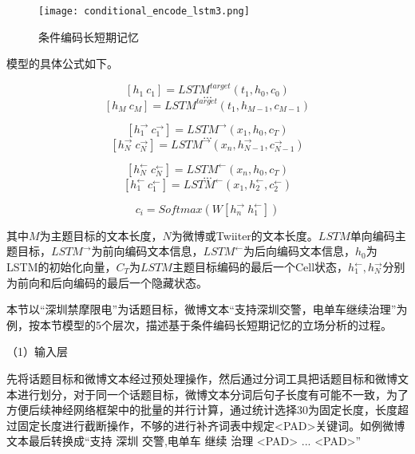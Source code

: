 \begin{figure}[htbp]
	\centering
	\texttt{[image: conditional\_encode\_lstm3.png]}
	\caption[rnn_vanish]{条件编码长短期记忆}
\end{figure}

模型的具体公式如下。

\begin{equation}\label{lstm_f}[h_1~c_1] = LSTM^{target}(t_1,h_0,c_0)\end{equation}
$$...$$
\begin{equation}\label{lstm_f}[h_M~c_M] = LSTM^{target}(t_1,h_{M-1},c_{M-1})\end{equation}

\begin{equation}\label{lstm_f}[h^{→}_{1}~c^{→}_{1}] = LSTM^{→}(x_1,h_0,c_T)\end{equation}
$$...$$
\begin{equation}\label{lstm_f}[h^{→}_{N}~c^{→}_{N}] = LSTM^{→}(x_n,h^{→}_{N-1},c^{→}_{N-1})\end{equation}

\begin{equation}\label{lstm_f}[h^{←}_{N}~c^{←}_{N}] = LSTM^{←}(x_n,h_0,c_T)\end{equation}
$$...$$
\begin{equation}\label{lstm_f}[h^{←}_{1}~c^{←}_{1}] = LSTM^{←}(x_1,h^{←}_{2},c^{←}_{2})\end{equation}

\begin{equation}\label{lstm_f}c_i=Softmax(W[h^{→}_n~h^{←}_1])\end{equation}

其中$M$为主题目标的文本长度，$N$为微博或Twiiter的文本长度。$LSTM$单向编码主题目标，$LSTM^{→}$为前向编码文本信息，$LSTM^{←}$为后向编码文本信息，$h_0$为LSTM的初始化向量，$C_T$为$LSTM$主题目标编码的最后一个Cell状态，$h^{←}_{1},h^{→}_{N}$分别为前向和后向编码的最后一个隐藏状态。

本节以“深圳禁摩限电”为话题目标，微博文本“支持深圳交警，电单车继续治理”为例，按本节模型的5个层次，描述基于条件编码长短期记忆的立场分析的过程。

（1）输入层

先将话题目标和微博文本经过预处理操作，然后通过分词工具把话题目标和微博文本进行划分，对于同一个话题目标，微博文本分词后句子长度有可能不一致，为了方便后续神经网络框架中的批量的并行计算，通过统计选择30为固定长度，长度超过固定长度进行截断操作，不够的进行补齐词表中规定<PAD>关键词。如例微博文本最后转换成“支持 深圳 交警,电单车 继续 治理 <PAD> ... <PAD>”

